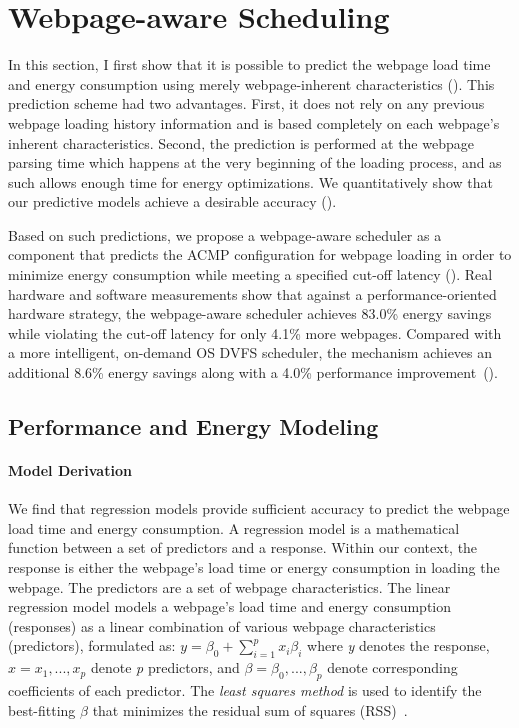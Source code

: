 \section{Webpage-aware Scheduling}
\label{sec:runtime:load}

In this section, I first show that it is possible to predict the webpage load time and energy consumption using merely webpage-inherent characteristics (). This prediction scheme had two advantages. First, it does not rely on any previous webpage loading history information and is based completely on each webpage's inherent characteristics. Second, the prediction is performed at the webpage parsing time which happens at the very beginning of the loading process, and as such allows enough time for energy optimizations. We quantitatively show that our predictive models achieve a desirable accuracy ().

Based on such predictions, we propose a webpage-aware scheduler as a \webrt component that predicts the ACMP configuration for webpage loading in order to minimize energy consumption while meeting a specified cut-off latency (). Real hardware and software measurements show that against a performance-oriented hardware strategy, the webpage-aware scheduler achieves 83.0\% energy savings while violating the cut-off latency for only 4.1\% more webpages. Compared with a more intelligent, on-demand OS DVFS scheduler, the mechanism achieves an additional 8.6\% energy savings along with a 4.0\% performance improvement~().

\subsection{Performance and Energy Modeling}
\label{sec:runtime:load:model}



\paragraph{Model Derivation} We find that regression models provide sufficient accuracy to predict the webpage load time and energy consumption. A regression model is a mathematical function between a set of predictors and a response. Within our context, the response is either the webpage's load time or energy consumption in loading the webpage. The predictors are a set of webpage characteristics. The linear regression model models a webpage's load time and energy consumption (responses) as a linear combination of various webpage characteristics (predictors), formulated as: $y = \beta_0 + \sum_{i=1}^{p} x_i \beta_i$ where \textit{y} denotes the response, \textit{$x = x_{1},...,x_{p}$} denote \textit{p} predictors, and \textit{$\beta = \beta_{0},...,\beta_{p}$} denote corresponding coefficients of each predictor. The \textit{least squares method} is used to identify the best-fitting $\beta$ that minimizes the residual sum of squares (RSS)~\cite{ESL}.

